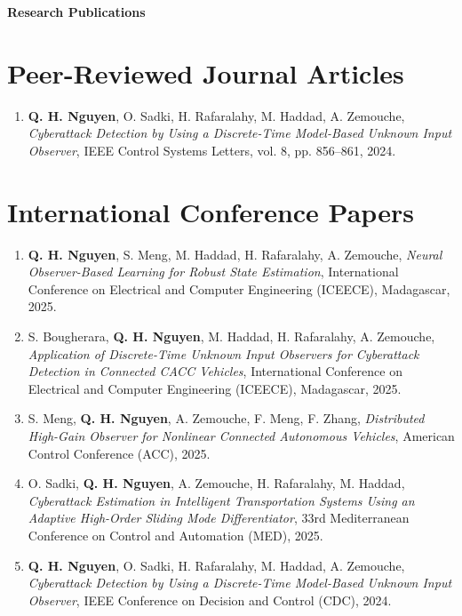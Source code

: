 \documentclass[a4paper,11pt]{article}
\begin{document}
\begin{center}
{\Large \textbf{Research Publications}}
\end{center}

\vspace{1em}

\section*{Peer-Reviewed Journal Articles}

\begin{enumerate}
\item \textbf{Q. H. Nguyen}, O. Sadki, H. Rafaralahy, M. Haddad, A. Zemouche,  
\emph{Cyberattack Detection by Using a Discrete-Time Model-Based Unknown Input Observer},  
IEEE Control Systems Letters, vol. 8, pp. 856--861, 2024.
\end{enumerate}

\section*{International Conference Papers}

\begin{enumerate}
\item \textbf{Q. H. Nguyen}, S. Meng, M. Haddad, H. Rafaralahy, A. Zemouche,  
\emph{Neural Observer-Based Learning for Robust State Estimation},  
International Conference on Electrical and Computer Engineering (ICEECE), Madagascar, 2025.

\item S. Bougherara, \textbf{Q. H. Nguyen}, M. Haddad, H. Rafaralahy, A. Zemouche,  
\emph{Application of Discrete-Time Unknown Input Observers for Cyberattack Detection in Connected CACC Vehicles},  
International Conference on Electrical and Computer Engineering (ICEECE), Madagascar, 2025.

\item S. Meng, \textbf{Q. H. Nguyen}, A. Zemouche, F. Meng, F. Zhang,  
\emph{Distributed High-Gain Observer for Nonlinear Connected Autonomous Vehicles},
American Control Conference (ACC), 2025.

\item O. Sadki, \textbf{Q. H. Nguyen}, A. Zemouche, H. Rafaralahy, M. Haddad,  
\emph{Cyberattack Estimation in Intelligent Transportation Systems Using an Adaptive High-Order Sliding Mode Differentiator},
33rd Mediterranean Conference on Control and Automation (MED), 2025.

\item \textbf{Q. H. Nguyen}, O. Sadki, H. Rafaralahy, M. Haddad, A. Zemouche,  
\emph{Cyberattack Detection by Using a Discrete-Time Model-Based Unknown Input Observer},  
IEEE Conference on Decision and Control (CDC), 2024.
\end{enumerate}
\end{document}
